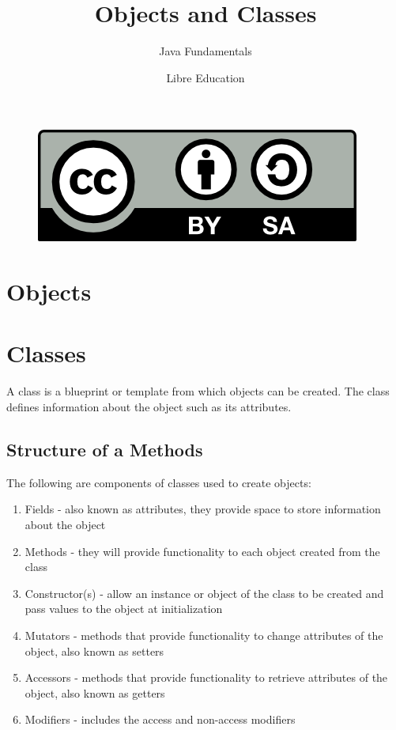 \documentclass[a4paper]{article}
\title{Objects and Classes}
\subtitle{Java Fundamentals}
\date{}
\author{Libre Education}
\begin{document}
\maketitle


\begin{figure}[b]
\includegraphics{BY-SA}
\centering
\end{figure}

\newpage

\section*{Objects}

\section*{Classes}
A class is a blueprint or template from which objects can be created. The class defines information about the object such as its attributes.

\subsection*{Structure of a Methods}
The following are components of classes used to create objects:

\begin{enumerate}

\item Fields - also known as attributes, they provide space to store information about the object
\item Methods - they will provide functionality to each object created from the class
\item Constructor(s) - allow an instance or object of the class to be created and pass values to the object at initialization
\item Mutators - methods that provide functionality to change attributes of the object, also known as setters
\item Accessors - methods that provide functionality to retrieve attributes of the object, also known as getters
\item Modifiers - includes the access and non-access modifiers

\end{enumerate}
\end{document}
